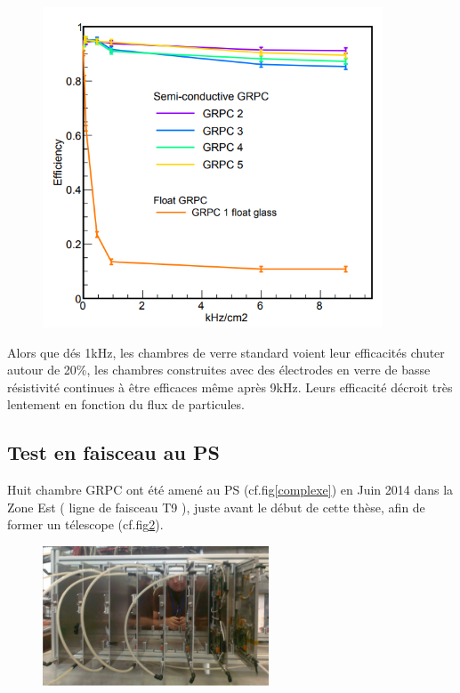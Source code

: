 \begin{figure}[ht!]
	\centering
	\includegraphics[width=0.9\textwidth]{GLA/effiDesy.png}
	\label{effiDesy}
\end{figure}

Alors que dés 1kHz, les chambres de verre standard voient leur efficacités chuter autour de 20\%, les chambres construites avec des électrodes en verre de basse résistivité continues à être efficaces même après 9kHz. Leurs efficacité décroit très lentement en fonction du flux de particules.

\subsection{Test en faisceau au PS}
Huit chambre GRPC ont été amené au PS (cf.fig\ref{complexe}) en Juin 2014 dans la Zone Est ( ligne de faisceau T9 ), juste avant le début de cette thèse, afin de former un télescope (cf.fig\ref{TelescopePS}).

\begin{figure}[ht!]
	\centering
	\includegraphics[width=0.6\textwidth]{GLA/TelescopePS.png}
	\label{TelescopePS}
\end{figure}

